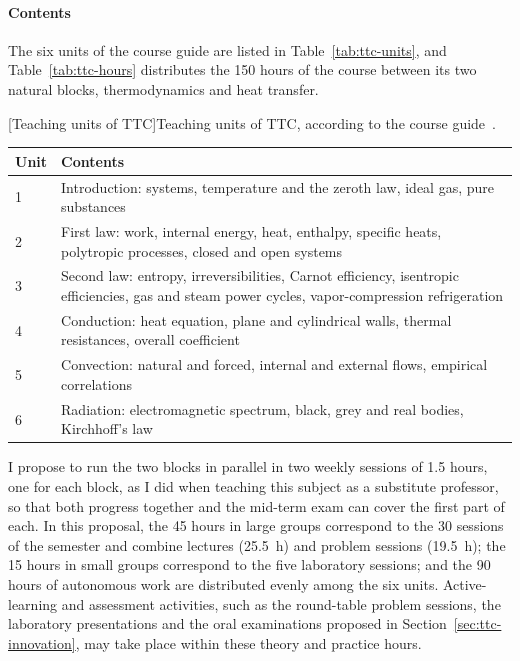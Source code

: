 \documentclass[11pt]{article}
\begin{document}
\paragraph{Contents}
The six units of the course guide are listed in Table~\ref{tab:ttc-units}, and Table~\ref{tab:ttc-hours} distributes the 150 hours of the course between its two natural blocks, thermodynamics and heat transfer.
\begin{center}\small
{}[Teaching units of TTC]{Teaching units of TTC, according to the course guide~\cite{UPCGuides}.}\label{tab:ttc-units}
\begin{tabularx}{\textwidth}{@{}p{0.6cm}X@{}}
\toprule
\textbf{Unit} & \textbf{Contents} \\
\midrule
1 & Introduction: systems, temperature and the zeroth law, ideal gas, pure substances \\
2 & First law: work, internal energy, heat, enthalpy, specific heats, polytropic processes, closed and open systems \\
3 & Second law: entropy, irreversibilities, Carnot efficiency, isentropic efficiencies, gas and steam power cycles, vapor-compression refrigeration \\
4 & Conduction: heat equation, plane and cylindrical walls, thermal resistances, overall coefficient \\
5 & Convection: natural and forced, internal and external flows, empirical correlations \\
6 & Radiation: electromagnetic spectrum, black, grey and real bodies, Kirchhoff's law \\
\bottomrule
\end{tabularx}
\end{center}

I propose to run the two blocks in parallel in two weekly sessions of 1.5 hours, one for each block, as I did when teaching this subject as a substitute professor, so that both progress together and the mid-term exam can cover the first part of each. 
In this proposal, the 45 hours in large groups correspond to the 30 sessions of the semester and combine lectures (25.5~h) and problem sessions (19.5~h); the 15 hours in small groups correspond to the five laboratory sessions; and the 90 hours of autonomous work are distributed evenly among the six units. 
Active-learning and assessment activities, such as the round-table problem sessions, the laboratory presentations and the oral examinations proposed in Section~\ref{sec:ttc-innovation}, may take place within these theory and practice hours.
\end{document}
